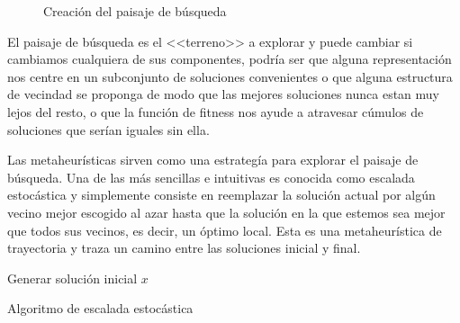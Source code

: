 \begin{figure}[H]
\caption{Creación del paisaje de búsqueda}
\end{figure}

El paisaje de búsqueda es el <<terreno>> a explorar y puede cambiar si cambiamos cualquiera de sus componentes, podría ser que alguna representación nos centre en un subconjunto de soluciones convenientes o que alguna estructura de vecindad se proponga de modo que las mejores soluciones nunca estan muy lejos del resto, o que la función de fitness nos ayude a atravesar cúmulos de soluciones que serían iguales sin ella.

Las metaheurísticas sirven como una estrategía para explorar el paisaje de búsqueda. Una de las más sencillas e intuitivas es conocida como escalada estocástica y simplemente consiste en reemplazar la solución actual por algún vecino mejor escogido al azar hasta que la solución en la que estemos sea mejor que todos sus vecinos, es decir, un óptimo local. Esta es una metaheurística de trayectoria y traza un camino entre las soluciones inicial y final.

%
\begin{algorithm}[H]
 Generar solución inicial $x$\;
    \label{alg:LS}
    \caption{Algoritmo de escalada estocástica}
\end{algorithm}

